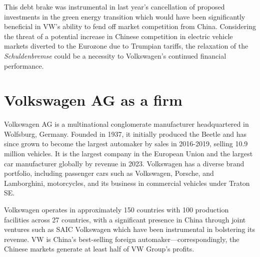 \documentclass[10pt]{article}
\begin{document}
This debt brake was instrumental in last year's  cancellation of proposed investments in the green energy transition which would have been significantly beneficial in VW's ability to fend off market competition from China. Considering the threat of a potential increase in Chinese competition in electric vehicle markets diverted to the Eurozone due to Trumpian tariffs, the relaxation of the \textit{Schuldenbremse} could be a necessity to Volkswagen's continued financial performance.

\newpage

\section{Volkswagen AG as a firm}


Volkswagen AG is a multinational conglomerate manufacturer headquartered in Wolfsburg, Germany. Founded in 1937, it initially produced the Beetle and has since grown to become the largest automaker by sales in 2016-2019, selling 10.9 million vehicles. It is the largest company in the European Union and the largest car manufacturer globally by revenue in 2023. Volkswagen has a diverse brand portfolio, including passenger cars such as Volkswagen, Porsche, and Lamborghini, motorcycles, and its business in commercial vehicles under Traton SE\autocite{vwgroupHistory1999}.

Volkswagen operates in approximately 150 countries with 100 production facilities across 27 countries, with a significant presence in China through joint ventures such as SAIC Volkswagen which have been instrumental in bolstering its revenue. VW is China's best-selling foreign automaker---correspondingly, the Chinese markets generate at least half of VW Group's profits\autocite{whiteVWAuditXinjiang2024}.
\end{document}
